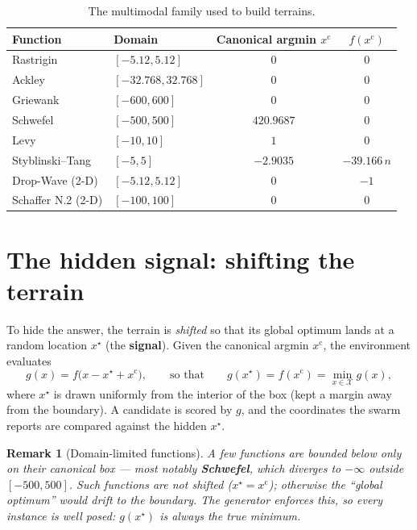 \documentclass[11pt,a4paper]{article}
\newtheorem{remark}{Remark}
\begin{document}
\begin{table}[H]
\centering
\caption{The multimodal family used to build terrains.}
\label{tab:functions}
\begin{tabular}{@{}llcc@{}}
\toprule
Function & Domain & Canonical argmin $x^{\mathrm{c}}$ & $f(x^{\mathrm{c}})$ \\
\midrule
Rastrigin          & $[-5.12, 5.12]$      & $0$        & $0$ \\
Ackley             & $[-32.768, 32.768]$  & $0$        & $0$ \\
Griewank           & $[-600, 600]$        & $0$        & $0$ \\
Schwefel           & $[-500, 500]$        & $420.9687$ & $0$ \\
Levy               & $[-10, 10]$          & $1$        & $0$ \\
Styblinski--Tang   & $[-5, 5]$            & $-2.9035$  & $-39.166\,n$ \\
Drop-Wave (2-D)    & $[-5.12, 5.12]$      & $0$        & $-1$ \\
Schaffer N.2 (2-D) & $[-100, 100]$        & $0$        & $0$ \\
\bottomrule
\end{tabular}
\end{table}

\section{The hidden signal: shifting the terrain}

To hide the answer, the terrain is \emph{shifted} so that its global optimum
lands at a random location $x^{\star}$ (the \textbf{signal}). Given the canonical
argmin $x^{\mathrm{c}}$, the environment evaluates
\begin{equation}
  g(x) = f\bigl(x - x^{\star} + x^{\mathrm{c}}\bigr),
  \qquad\text{so that}\qquad
  g(x^{\star}) = f(x^{\mathrm{c}}) = \min_{x \in \mathcal{X}} g(x),
  \label{eq:shift}
\end{equation}
where $x^{\star}$ is drawn uniformly from the interior of the box (kept a margin
away from the boundary). A candidate is scored by $g$, and the coordinates the
swarm reports are compared against the hidden $x^{\star}$.

\begin{remark}[Domain-limited functions]
A few functions are bounded below only on their canonical box --- most notably
\textbf{Schwefel}, which diverges to $-\infty$ outside $[-500, 500]$. Such
functions are \emph{not} shifted ($x^{\star} = x^{\mathrm{c}}$); otherwise the
``global optimum'' would drift to the boundary. The generator enforces this, so
every instance is well posed: $g(x^{\star})$ is always the true minimum.
\end{remark}
\end{document}
